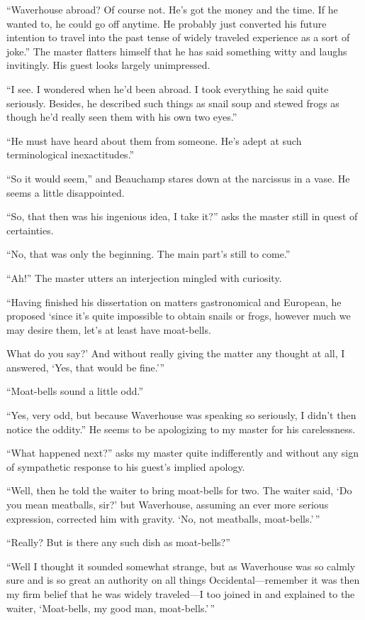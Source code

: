 \documentclass{book}
\begin{document}
``Waverhouse abroad? Of course not. He's got the money and the time. If
he wanted to, he could go off anytime. He probably just converted his
future intention to travel into the past tense of widely traveled
experience as a sort of joke.'' The master flatters himself that he has
said something witty and laughs invitingly. His guest looks largely
unimpressed.

``I see. I wondered when he'd been abroad. I took everything he said
quite seriously. Besides, he described such things as snail soup and
stewed frogs as though he'd really seen them with his own two eyes.''

``He must have heard about them from someone. He's adept at such
terminological inexactitudes.''

``So it would seem,'' and Beauchamp stares down at the narcissus in a
vase. He seems a little disappointed.

``So, that then was his ingenious idea, I take it?'' asks the master
still in quest of certainties.

``No, that was only the beginning. The main part's still to come.''

``Ah!'' The master utters an interjection mingled with curiosity.

``Having finished his dissertation on matters gastronomical and
European, he proposed `since it's quite impossible to obtain snails or
frogs, however much we may desire them, let's at least have moat-bells.

What do you say?' And without really giving the matter any thought at
all, I answered, `Yes, that would be fine.'''

``Moat-bells sound a little odd.''

``Yes, very odd, but because Waverhouse was speaking so seriously, I
didn't then notice the oddity.'' He seems to be apologizing to my master
for his carelessness.

``What happened next?'' asks my master quite indifferently and without
any sign of sympathetic response to his guest's implied apology.

``Well, then he told the waiter to bring moat-bells for two. The waiter
said, `Do you mean meatballs, sir?' but Waverhouse, assuming an ever
more serious expression, corrected him with gravity. `No, not meatballs,
moat-bells.'\,''

``Really? But is there any such dish as moat-bells?''

``Well I thought it sounded somewhat strange, but as Waverhouse was so
calmly sure and is so great an authority on all things
Occidental---remember it was then my firm belief that he was widely
traveled---I too joined in and explained to the waiter, `Moat-bells, my
good man, moat-bells.'\,''
\end{document}
